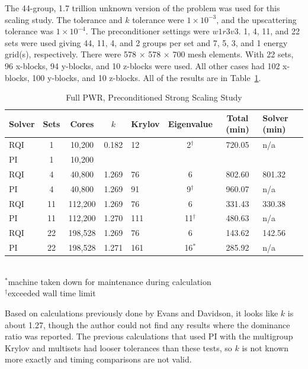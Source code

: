 The 44-group, 1.7 trillion unknown version of the problem was used for this scaling study. The tolerance and $k$ tolerance were $1 \times 10^{-3}$, and the upscattering tolerance was $1 \times 10^{-4}$. The preconditioner settings were $w1r3v3$. 1, 4, 11, and 22 sets were used giving 44, 11, 4, and 2 groups per set and 7, 5, 3, and 1 energy grid(s), respectively. There were 578 $\times$ 578 $\times$ 700 mesh elements. With 22 sets, 96 x-blocks, 94 y-blocks, and 10 z-blocks were used. All other cases had 102 x-blocks, 100 y-blocks, and 10 z-blocks. All of the results are in Table~\ref{table:full PWR}. 
%
\begin{table}[!h]
\caption{Full PWR, Preconditioned Strong Scaling Study}
\begin{center}
\begin{tabular}{l c c c l c c l}
\hline
Solver & Sets & Cores & $k$ & Krylov & Eigenvalue & Total (min) & Solver (min)\\[0.5ex]
\hline
RQI & 1   & 10,200   & 0.182 & 12    & 2$^{\dag}$ & 720.05 & n/a \\
PI    & 1   & 10,200   &  &  &       &  &  \\
RQI & 4   & 40,800   & 1.269 & 76   &  6               & 802.60 & 801.32 \\
PI    & 4   & 40,800   & 1.269 & 91   & 9$^{\dag}$       & 960.07 & n/a \\
RQI & 11 & 112,200 & 1.269 & 76   & 6                & 331.43 & 330.38 \\
PI    & 11 & 112,200 & 1.270 & 111 & 11$^{\dag}$ & 480.63 & n/a \\
RQI & 22 & 198,528 & 1.269 & 76   & 6                & 143.62 & 142.56 \\
PI    & 22 & 198,528 & 1.271 & 161 & 16$^{*}$      & 285.92 & n/a \\
\hline 
\end{tabular}\\
$^{*}$machine taken down for maintenance during calculation \\
$^{\dag}$exceeded wall time limit
\end{center}
\label{table:full PWR}
\end{table}  

Based on calculations previously done by Evans and Davidson, it looks like $k$ is about 1.27, though the author could not find any results where the dominance ratio was reported. The previous calculations that used PI with the multigroup Krylov and multisets had looser tolerances than these tests, so $k$ is not known more exactly and timing comparisons are not valid. 

